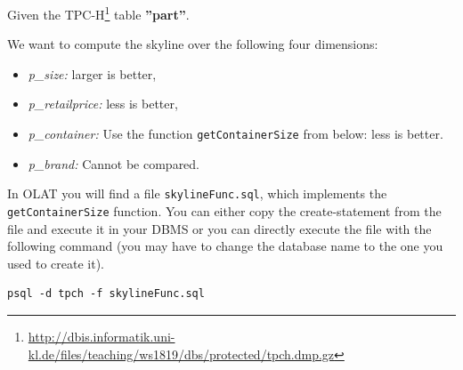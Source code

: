 


\newcommand{\subtitle}{\textbf{Exercise 9}}
\newcommand{\outdate}{08.01.2024}
\newcommand{\duedate}{15.01.2024 12:00 MEZ}
\newcommand{\video}{049}






Given the TPC-H\footnote{\url{http://dbis.informatik.uni-kl.de/files/teaching/ws1819/dbs/protected/tpch.dmp.gz}} table \textbf{''part''}.

We want to compute the skyline over the following four dimensions:
\begin{itemize}
\item \emph{p\_size:} larger is better,
\item \emph{p\_retailprice:} less is better,
\item \emph{p\_container:} Use the function \texttt{getContainerSize} from below: less is better.
\item \emph{p\_brand:} Cannot be compared.
\end{itemize}

In OLAT you will find a file \texttt{skylineFunc.sql}, which implements the \texttt{getContainerSize} function.
You can either copy the create-statement from the file and execute it in your DBMS or you can directly execute the file with the following command (you may have to change the database name to the one you used to create it).
\begin{verbatim}
psql -d tpch -f skylineFunc.sql
\end{verbatim} 

